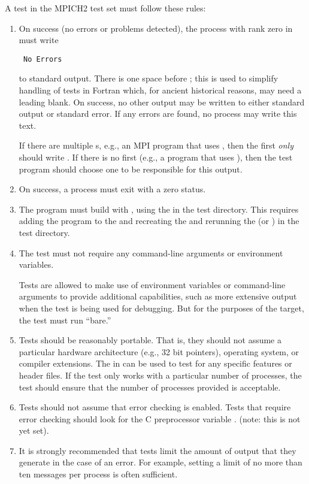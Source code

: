 A test in the MPICH2 test set must follow these rules:
\begin{enumerate}
\item On success (no errors or problems detected), the process with
rank zero in  must write
\begin{verbatim}
 No Errors
\end{verbatim}
to standard output.  
There is one space before ; this is used to simplify handling
of tests in Fortran which, for ancient historical reasons, may need a
leading blank.  On success, no other output may be written to either
standard output or standard error.
If any errors are found, no process may write
this text.

If there are multiple s, e.g., an MPI program
that uses , then the first 
\emph{only} should write .  If there is no first
 (e.g., a program that uses
), then the test program should choose one
 to be responsible for this output.

\item On success, a process must exit with a zero status.

\item The program must build with , using the
 in the test directory.  This requires adding the
program to the  and recreating the
 and rerunning the  (or
) in the test directory.

\item The test must not require any command-line arguments or
environment variables.

Tests are allowed to make use of environment
variables or command-line arguments to provide additional
capabilities, such as more extensive output when the test is being
used for debugging.  But for the purposes of the 
target, the test must run ``bare.''

\item Tests should be reasonably portable.  That is, they should not
assume a particular hardware architecture (e.g., 32 bit pointers),
operating system, or compiler extensions.  The  in
 can be used to test for any specific
features or header files.  If the test only works with a particular
number of processes, the test should ensure that the number of
processes provided is acceptable.  

\item Tests should not assume that error checking is enabled.  Tests
that require error checking should look for the C preprocessor
variable . (note: this is not yet set).

\item It is strongly recommended that tests limit the amount of output
that they generate in the case of an error.  For example, setting a
limit of no more than ten messages per process is often sufficient.  
\end{enumerate}

